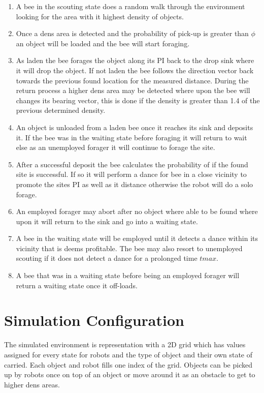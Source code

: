 \documentclass[12pt]{article}
\begin{document}
\begin{enumerate}[nolistsep]
	\item A bee in the scouting state does a random walk through the environment looking for the area with it highest density of objects.
	\item Once a dens area is detected and the probability  of pick-up is greater than $\phi$ an object will be loaded and the bee will start foraging.
	\item As laden the bee forages the object along its PI back to the drop sink where it will drop the object. If not laden the bee follows the direction vector back towards the previous found location for the measured distance. During the return process a higher dens area may be detected where upon the bee will changes its bearing vector, this is done if the density is greater than 1.4 of the previous determined density.
	\item An object is unloaded from a laden bee once it reaches its sink and deposits it. If the bee was in the waiting state before foraging it will return to wait else as an unemployed forager it will continue to forage the site.
	\item After a successful deposit the bee calculates the probability of if the found site is successful. If so it will perform a dance for bee in a close vicinity to promote the sites PI as well as it distance otherwise the robot will do a solo forage.
	\item An employed forager may abort after no object where able to be found where upon it will return to the sink and go into a waiting state.
	\item A bee in the waiting state will be employed until it detects a dance within its vicinity that is deems profitable.  The bee may also resort to unemployed scouting if it does not detect a dance for a prolonged time $tmax$.
	\item A bee that was in a waiting state before being an employed forager will return a waiting state once it off-loads.
\end{enumerate}

\section{Simulation Configuration}

\par{The simulated environment is representation with a 2D grid which has values assigned for every state for robots and the type of object and their own state of carried. Each object and robot fills one index of the grid. Objects can be picked up by robots once on top of an object or move around it as an obstacle to get to higher dens areas.}
\end{document}
